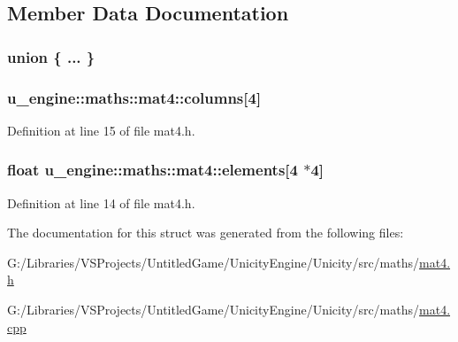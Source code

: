 \subsection{Member Data Documentation}
\hypertarget{structu__engine_1_1maths_1_1mat4_af4fe66f09ffebbe03e558488b93053de}{}\subsubsection[{"@1}]{\setlength{\rightskip}{0pt plus 5cm}union \{ ... \} }\label{structu__engine_1_1maths_1_1mat4_af4fe66f09ffebbe03e558488b93053de}
\hypertarget{structu__engine_1_1maths_1_1mat4_a6aad7268685211b538669541ff52895e}{}
\subsubsection[{columns}]{ u\+\_\+engine\+::maths\+::mat4\+::columns\mbox{[}4\mbox{]}}\label{structu__engine_1_1maths_1_1mat4_a6aad7268685211b538669541ff52895e}


Definition at line 15 of file mat4.\+h.

\hypertarget{structu__engine_1_1maths_1_1mat4_a0efbb2abf6b7fd363620e1b0130a7e1c}{}
\subsubsection[{elements}]{\setlength{\rightskip}{0pt plus 5cm}float u\+\_\+engine\+::maths\+::mat4\+::elements\mbox{[}4 $\ast$4\mbox{]}}\label{structu__engine_1_1maths_1_1mat4_a0efbb2abf6b7fd363620e1b0130a7e1c}


Definition at line 14 of file mat4.\+h.



The documentation for this struct was generated from the following files\+:\begin{DoxyCompactItemize}
\item 
G\+:/\+Libraries/\+V\+S\+Projects/\+Untitled\+Game/\+Unicity\+Engine/\+Unicity/src/maths/\hyperlink{mat4_8h}{mat4.\+h}\item 
G\+:/\+Libraries/\+V\+S\+Projects/\+Untitled\+Game/\+Unicity\+Engine/\+Unicity/src/maths/\hyperlink{mat4_8cpp}{mat4.\+cpp}\end{DoxyCompactItemize}
